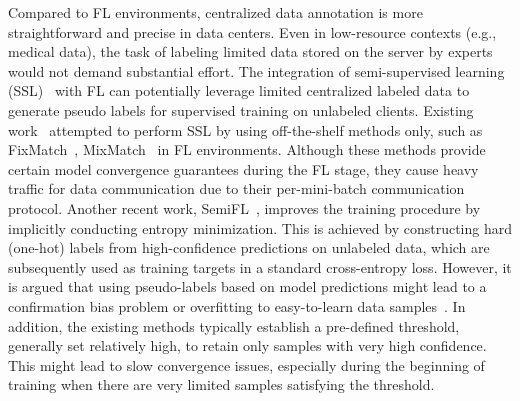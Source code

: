 \documentclass[withindex,glossary,firstyr]{cam-thesis}
\begin{document}
Compared to FL environments, centralized data annotation is more straightforward and precise in data centers. Even in low-resource contexts (e.g., medical data), the task of labeling limited data stored on the server by experts would not demand substantial effort. The integration of semi-supervised learning (SSL)~\citep{chapelle2009semi, yang2022survey,fixmatch,mixmatch} with FL can potentially leverage limited centralized labeled data to generate pseudo labels for supervised training on unlabeled clients. Existing work~\citep{jeong2020federated,zhang2021improving} attempted to perform SSL by using off-the-shelf methods only, such as FixMatch~\citep{fixmatch}, MixMatch~\citep{mixmatch} in FL environments. Although these methods provide certain model convergence guarantees during the FL stage, they cause heavy traffic for data communication due to their per-mini-batch communication protocol. Another recent work, SemiFL~\citep{semifl}, improves the training procedure by implicitly conducting entropy minimization. This is achieved by constructing hard (one-hot) labels from high-confidence predictions on unlabeled data, which are subsequently used as training targets in a standard cross-entropy loss. However, it is argued that using pseudo-labels based on model predictions might lead to a confirmation bias problem or overfitting to easy-to-learn data samples~\citep{nguyen2023boosting}. In addition, the existing methods typically establish a pre-defined threshold, generally set relatively high, to retain only samples with very high confidence.
This might lead to slow convergence issues, especially during the beginning of training when there are very limited samples satisfying the threshold.
\end{document}
